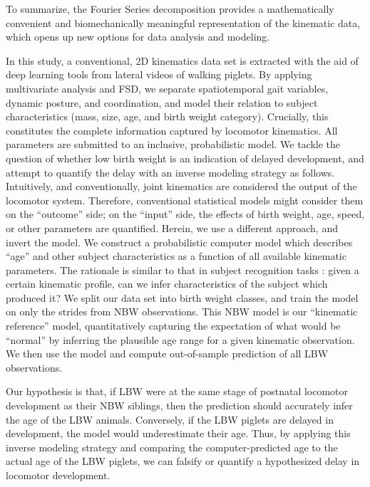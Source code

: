 To summarize, the Fourier Series decomposition provides a mathematically convenient and biomechanically meaningful representation of the kinematic data, which opens up new options for data analysis and modeling.


In this study, a conventional, 2D kinematics data set is extracted with the aid of deep learning tools from lateral videos of walking piglets.
By applying multivariate analysis and FSD, we separate spatiotemporal gait variables, dynamic posture, and coordination, and model their relation to subject characteristics (mass, size, age, and birth weight category).
Crucially, this constitutes the complete information captured by locomotor kinematics.
All parameters are submitted to an inclusive, probabilistic model.
We tackle the question of whether low birth weight is an indication of delayed development, and attempt to quantify the delay with an inverse modeling strategy as follows.
Intuitively, and conventionally, joint kinematics are considered the output of the locomotor system.
Therefore, conventional statistical models might consider them on the ``outcome'' side; on the ``input'' side, the effects of birth weight, age, speed, or other parameters are quantified.
Herein, we use a different approach, and invert the model.
We construct a probabilistic computer model which describes ``age'' and other subject characteristics as a function of all available kinematic parameters.
The rationale is similar to that in subject recognition tasks \citep[e.g.][]{Patua2021}: given a certain kinematic profile, can we infer characteristics of the subject which produced it?
We split our data set into birth weight classes, and train the model on only the strides from NBW observations.
This NBW model is our ``kinematic reference'' model, quantitatively capturing the expectation of what would be ``normal'' by inferring the plausible age range for a given kinematic observation.
We then use the model and compute out-of-sample prediction of all LBW observations.


Our hypothesis is that, if LBW were at the same stage of postnatal locomotor development as their NBW siblings, then the prediction should accurately infer the age of the LBW animals.
Conversely, if the LBW piglets are delayed in development, the model would underestimate their age.
Thus, by applying this inverse modeling strategy and comparing the computer-predicted age to the actual age of the LBW piglets, we can falsify or quantify a hypothesized delay in locomotor development.



